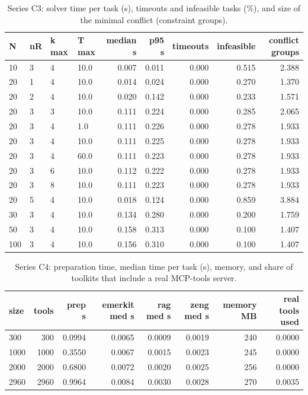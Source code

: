 \begin{table}[!ht]\centering\caption{Series C3: solver time per task (s), timeouts and infeasible tasks (\%), and size of the minimal conflict (constraint groups).}\label{tab:c3}\scriptsize
\begin{tabular}{llllrrrrr}\toprule
N & nR & k max & T max & median s & p95 s & timeouts & infeasible & conflict groups \\ \midrule
10 & 3 & 4 & 10.0 & 0.007 & 0.011 & 0.000 & 0.515 & 2.388 \\
20 & 1 & 4 & 10.0 & 0.014 & 0.024 & 0.000 & 0.270 & 1.370 \\
20 & 2 & 4 & 10.0 & 0.020 & 0.142 & 0.000 & 0.233 & 1.571 \\
20 & 3 & 3 & 10.0 & 0.111 & 0.224 & 0.000 & 0.285 & 2.065 \\
20 & 3 & 4 & 1.0 & 0.111 & 0.226 & 0.000 & 0.278 & 1.933 \\
20 & 3 & 4 & 10.0 & 0.111 & 0.225 & 0.000 & 0.278 & 1.933 \\
20 & 3 & 4 & 60.0 & 0.111 & 0.223 & 0.000 & 0.278 & 1.933 \\
20 & 3 & 6 & 10.0 & 0.112 & 0.222 & 0.000 & 0.278 & 1.933 \\
20 & 3 & 8 & 10.0 & 0.111 & 0.223 & 0.000 & 0.278 & 1.933 \\
20 & 5 & 4 & 10.0 & 0.018 & 0.124 & 0.000 & 0.859 & 3.884 \\
30 & 3 & 4 & 10.0 & 0.134 & 0.280 & 0.000 & 0.200 & 1.759 \\
50 & 3 & 4 & 10.0 & 0.158 & 0.313 & 0.000 & 0.100 & 1.407 \\
100 & 3 & 4 & 10.0 & 0.156 & 0.310 & 0.000 & 0.100 & 1.407 \\
\bottomrule\end{tabular}\end{table}
\begin{table}[!ht]\centering\caption{Series C4: preparation time, median time per task (s), memory, and share of toolkits that include a real MCP-tools server.}\label{tab:c4}\scriptsize
\begin{tabular}{lrrrrrrr}\toprule
size & tools & prep s & emerkit med s & rag med s & zeng med s & memory MB & real tools used \\ \midrule
300 & 300 & 0.0994 & 0.0065 & 0.0009 & 0.0019 & 240 & 0.0000 \\
1000 & 1000 & 0.3550 & 0.0067 & 0.0015 & 0.0023 & 245 & 0.0000 \\
2000 & 2000 & 0.6800 & 0.0072 & 0.0020 & 0.0025 & 256 & 0.0000 \\
2960 & 2960 & 0.9964 & 0.0084 & 0.0030 & 0.0028 & 270 & 0.0035 \\
\bottomrule\end{tabular}\end{table}
